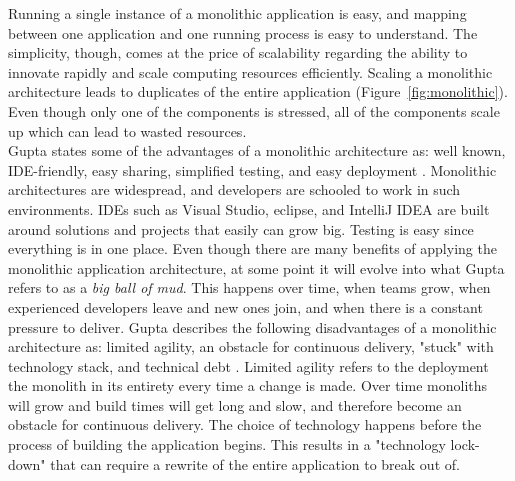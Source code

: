 \noindent
Running a single instance of a monolithic application is easy, and mapping between one application and one running process is easy to understand. The simplicity, though, comes at the price of scalability regarding the ability to innovate rapidly and scale computing resources efficiently. Scaling a monolithic architecture leads to duplicates of the entire application (Figure~\ref{fig:monolithic}). Even though only one of the components is stressed, all of the components scale up which can lead to wasted resources. \\

\noindent
Gupta states some of the advantages of a monolithic architecture as: well known, IDE-friendly, easy sharing, simplified testing, and easy deployment \cite{arongupta}. Monolithic architectures are widespread, and developers are schooled to work in such environments. IDEs such as Visual Studio, eclipse, and IntelliJ IDEA are built around solutions and projects that easily can grow big. Testing is easy since everything is in one place. Even though there are many benefits of applying the monolithic application architecture, at some point it will evolve into what Gupta refers to as a \textit{big ball of mud}. This happens over time, when teams grow, when experienced developers leave and new ones join, and when there is a constant pressure to deliver. Gupta describes the following disadvantages of a monolithic architecture as: limited agility, an obstacle for continuous delivery, "stuck" with technology stack, and technical debt \cite{arongupta}. Limited agility refers to the deployment the monolith in its entirety every time a change is made. Over time monoliths will grow and build times will get long and slow, and therefore become an obstacle for continuous delivery. The choice of technology happens before the process of building the application begins. This results in a "technology lock-down" that can require a rewrite of the entire application to break out of.